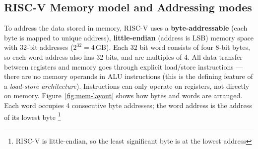 \documentclass[9pt, a4paper]{extarticle}
\begin{document}
\subsection{RISC-V Memory model and Addressing modes}

To address the data stored in memory, RISC-V uses a \textbf{byte-addressable} (each byte is mapped to unique address), \textbf{little-endian} (address is LSB) memory space with 32-bit addresses ($2^{32} = 4$\,GB). Each 32 bit word consists of four 8-bit bytes, so each word address also has 32 bits, and are multiples of 4. All data transfer between registers and memory goes through explicit load/store instructions --- there are no memory operands in ALU instructions (this is the defining feature of a \emph{load-store architecture}). Instructions can only operate on registers, not directly on memory. Figure~\ref{fig:mem-layout} shows how bytes and words are arranged. Each word occupies 4 consecutive byte addresses; the word address is the address of its lowest byte \footnote{RISC-V is little-endian, so the least significant byte is at the lowest address}
\end{document}
